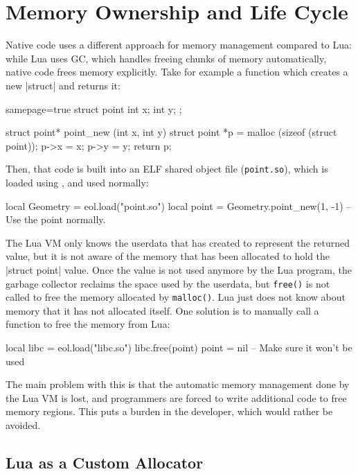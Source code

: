 \section{Memory Ownership and Life Cycle}

Native code uses a different approach for memory management compared to Lua:
while Lua uses \gls{GC}, which handles freeing chunks of memory automatically,
native code frees memory explicitly. Take for example a function which creates
a new \Mc|struct| and returns it:

\begin{ccode*}{samepage=true}
struct point { int x; int y; };

struct point* point_new (int x, int y) {
  struct point *p = malloc (sizeof (struct point));
  p->x = x;
  p->y = y;
  return p;
}
\end{ccode*}

Then, that code is built into an ELF shared object file (\verb|point.so|),
which is loaded using \Eol*, and used normally:

\begin{luacode}
local Geometry = eol.load("point.so")
local point = Geometry.point_new(1, -1)
-- Use the point normally.
\end{luacode}

The Lua VM only knows the userdata that \Eol* has created to represent the
returned value, but it is not aware of the memory that has been allocated to
hold the \Mc|struct point| value. Once the value is not used anymore by the
Lua program, the garbage collector reclaims the space used by the userdata,
but \verb|free()| is not called to free the memory allocated by
\verb|malloc()|. Lua just does not know about memory that it has not allocated
itself. One solution is to manually call a function to free the memory from
Lua:

\begin{luacode}
local libc = eol.load("libc.so")
libc.free(point)
point = nil  -- Make sure it won't be used
\end{luacode}

The main problem with this is that the automatic memory management done by the
Lua VM is lost, and programmers are forced to write additional code to free
memory regions. This puts a burden in the developer, which would rather be
avoided.


\subsection{Lua as a Custom Allocator}
  \label{sec:userdata-lua-custom-allocator}

